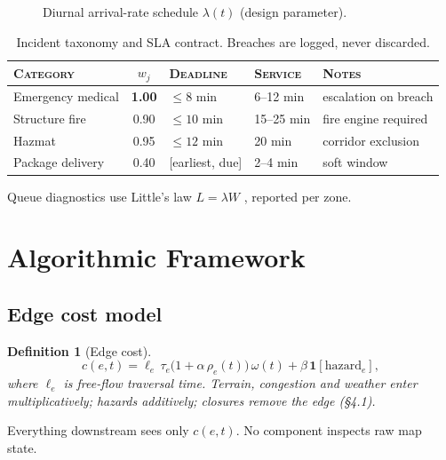 \documentclass[11pt,a4paper]{article}
\theoremstyle{spaceddef}
\newtheorem{definition}{Definition}[section]
\theoremstyle{spacedplain}
\begin{document}
\begin{figure}[H]\centering
{}
\caption{Diurnal arrival-rate schedule $\lambda(t)$ (design parameter).}
\label{fig:lambda}
\end{figure}

\begin{table}[H]\centering\small
\begin{tabular}{@{}lclll@{}}
\toprule
\textsc{Category} & $w_j$ & \textsc{Deadline} & \textsc{Service} & \textsc{Notes} \\
\midrule
Emergency medical & \textbf{1.00} & $\le 8$ min & 6--12 min & escalation on breach \\
Structure fire    & 0.90 & $\le 10$ min & 15--25 min & fire engine required \\
Hazmat            & 0.95 & $\le 12$ min & 20 min & corridor exclusion \\
Package delivery  & 0.40 & [earliest, due] & 2--4 min & soft window \\
\bottomrule
\end{tabular}
\caption{Incident taxonomy and SLA contract. Breaches are logged, never discarded.}
\end{table}

Queue diagnostics use Little's law $L=\lambda W$ \cite{little1961}, reported per zone.

\section{Algorithmic Framework}\label{sec:algo}

\subsection{Edge cost model}\label{sec:cost}
\begin{definition}[Edge cost]\label{def:cost}
\begin{equation}\label{eq:cost}
c(e,t)=\ell_e\,\tau_e\bigl(1+\alpha\,\rho_e(t)\bigr)\,\omega(t)
+\beta\,\mathbf{1}[\mathrm{hazard}_e],
\end{equation}
where $\ell_e$ is free-flow traversal time. Terrain, congestion and weather enter
multiplicatively; hazards additively; closures remove the edge (\S4.1).
\end{definition}
Everything downstream sees only $c(e,t)$. No component inspects raw map state.
\end{document}

